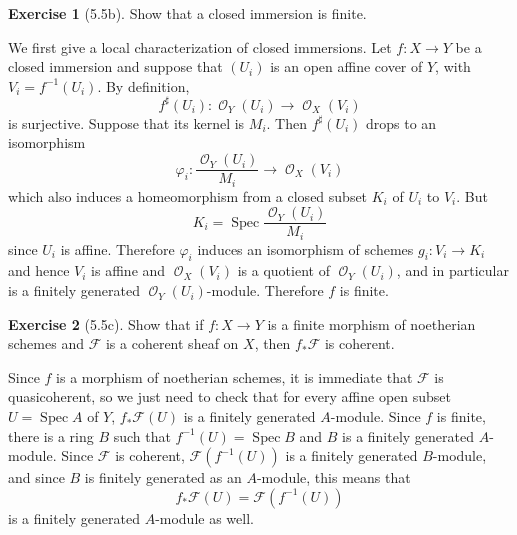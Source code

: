 \documentclass[10pt]{article}
\newcommand{\Spec}{\operatorname{Spec}}
\DeclareMathOperator{\Olo}{\mathscr O}
\theoremstyle{definition}
\newtheorem{exer}{Exercise}
\begin{document}
\begin{exer}[5.5b]
Show that a closed immersion is finite.
\end{exer}

We first give a local characterization of closed immersions.
Let $f: X \to Y$ be a closed immersion and suppose that $(U_i)$ is an open affine cover of $Y$, with $V_i = f^{-1}(U_i)$.
By definition,
$$f^\sharp(U_i): \Olo_Y(U_i) \to \Olo_X(V_i)$$
is surjective. Suppose that its kernel is $M_i$. Then $f^\sharp(U_i)$ drops to an isomorphism
$$\varphi_i: \frac{\Olo_Y(U_i)}{M_i} \to \Olo_X(V_i)$$
which also induces a homeomorphism from a closed subset $K_i$ of $U_i$ to $V_i$.
But
$$K_i = \Spec \frac{\Olo_Y(U_i)}{M_i}$$
since $U_i$ is affine.
Therefore $\varphi_i$ induces an isomorphism of schemes $g_i: V_i \to K_i$ and hence $V_i$ is affine and $\Olo_X(V_i)$ is a quotient of $\Olo_Y(U_i)$, and in particular is a finitely generated $\Olo_Y(U_i)$-module.
Therefore $f$ is finite.

\begin{exer}[5.5c]
Show that if $f: X \to Y$ is a finite morphism of noetherian schemes and $\mathscr F$ is a coherent sheaf on $X$, then $f_* \mathscr F$ is coherent.
\end{exer}

Since $f$ is a morphism of noetherian schemes, it is immediate that $\mathscr F$ is quasicoherent, so we just need to check that for every affine open subset $U = \Spec A$ of $Y$, $f_* \mathscr F(U)$ is a finitely generated $A$-module.
Since $f$ is finite, there is a ring $B$ such that $f^{-1}(U) = \Spec B$ and $B$ is a finitely generated $A$-module.
Since $\mathscr F$ is coherent, $\mathscr F(f^{-1}(U))$ is a finitely generated $B$-module, and since $B$ is finitely generated as an $A$-module, this means that
$$f_* \mathscr F(U) = \mathscr F(f^{-1}(U))$$
is a finitely generated $A$-module as well.
\end{document}

